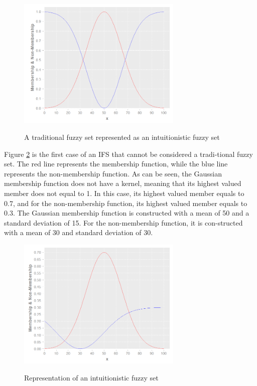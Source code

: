 \begin{figure}
\caption{A traditional fuzzy set represented as an intuitionistic fuzzy set}
\centering \includegraphics[width=0.7\textwidth]{img/traditional-set-as-ifs.png}
\label{figure:traditional-set-as-ifs}
\end{figure}

Figure \ref{figure:example-of-ifs} is the first case of an IFS that cannot be
considered a tradi-tional fuzzy set. The red line represents the membership
function, while the blue line represents the non-membership function. As can be
seen, the Gaussian membership function does not have a kernel, meaning that its
highest valued member does not equal to 1. In this case, its highest valued
member equals to 0.7, and for the non-membership function, its highest valued
member equals to 0.3. The Gaussian membership function is constructed with a
mean of 50 and a standard deviation of 15. For the non-membership function, it
is con-structed with a mean of 30 and standard deviation of 30.

\begin{figure}
\caption{Representation of an intuitionistic fuzzy set} \centering
\includegraphics[width=0.7\textwidth]{img/example-of-ifs.png}
\label{figure:example-of-ifs}
\end{figure}
